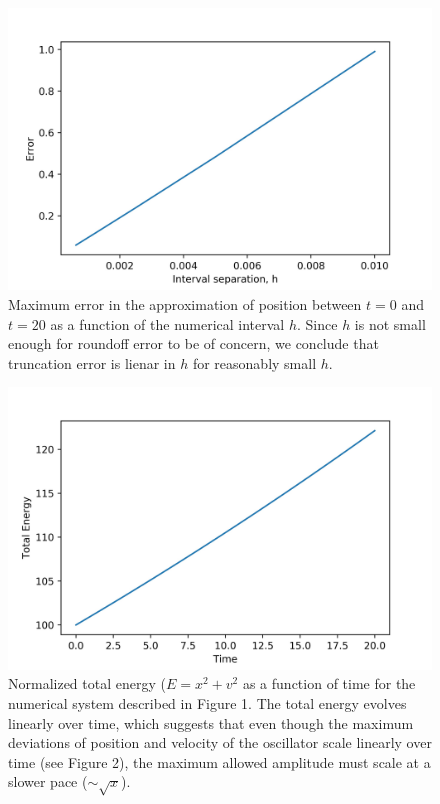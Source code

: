 \documentclass{article}
\begin{document}
\begin{figure}[H]
\includegraphics[width=\textwidth]{HErr1.jpg}
\caption{Maximum error in the approximation of position between $t = 0$ and $t = 20$ as a function of the numerical interval $h$. Since $h$ is not small enough for roundoff error to be of concern, we conclude that truncation error is lienar in $h$ for reasonably small $h$.}
\end{figure}

\begin{figure}[H]
\includegraphics[width=\textwidth]{TE1.jpg}
\caption{Normalized total energy ($E = x^2 + v^2$ as a function of time for the numerical system described in Figure 1. The total energy evolves linearly over time, which suggests that even though the maximum deviations of position and velocity of the oscillator scale linearly over time (see Figure 2), the maximum allowed amplitude must scale at a slower pace ($\sim \sqrt{x}$).}
\end{figure}
\end{document}
